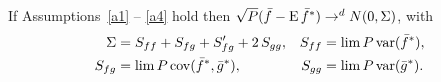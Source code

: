 If Assumptions~\ref{a1} -- \ref{a4} hold then
$\sqrt{P} (\bar{f} - \operatorname{E} \bar{f}^*) \to^d N(0, \Sigma)$,
with
\begin{align*}
    \Sigma &= S_{ff} + S_{fg} + S_{fg}' + 2 \, S_{gg}, &
    S_{ff}  &= \lim P \operatorname{var}(\bar{f}^*), \\
    S_{fg}  &= \lim P \operatorname{cov}(\bar{f}^*, \bar{g}^*), &
    S_{gg}  &= \lim P \operatorname{var}(\bar{g}^*).
\end{align*}

